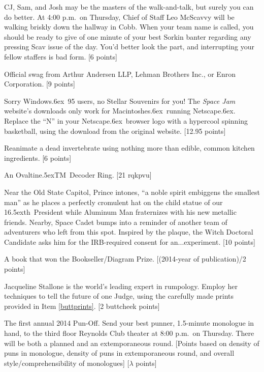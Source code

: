 \documentclass{book}
\def\th{\raise.5ex\hbox{\scriptsize th}}
\def\tm{\raise.5ex\hbox{\scriptsize TM}}
\def\tr{\raise.6ex\hbox{\scriptsize \textregistered}}
\begin{document}
\begin{list}{}{}
\item  CJ, Sam, and Josh may be the masters of the walk-and-talk, but  surely you can do better. At 4:00 p.m.\ on Thursday, Chief of Staff Leo McScavvy  will be walking briskly down the hallway in Cobb. When your team name is called, you should be ready to give of one minute of your best Sorkin banter regarding any pressing Scav issue of the day. You'd better look the part, and interrupting your fellow staffers is bad form. [6 points]

\item Official swag from Arthur Andersen LLP, Lehman Brothers Inc., or Enron Corporation. [9 points]

\item Sorry Windows\tr\ 95 users, no Stellar Souvenirs for you! The \emph{Space Jam} website's downloads only work for Macintoshes\tr\ running Netscape\tr. Replace the ``N'' in your Netscape\tr\ browser logo with a hypercool spinning basketball, using the download from the original website.  [12.95 points]

\setcounter{items}{13}

\item Reanimate a dead invertebrate using nothing more than edible, common kitchen ingredients. [6 points]

\item An Ovaltine\tm\ Decoder Ring. [21 rqkpvu]

\item Near the Old State Capitol, Prince intones, ``a noble spirit embiggens the smallest man'' as he places a perfectly cromulent hat on the child statue of our 16\th\ President while Aluminum Man fraternizes with his new metallic friends. Nearby, Space Cadet bumps into a reminder of another team of adventurers who left from this spot. Inspired by the plaque, the Witch Doctoral Candidate asks him for the IRB-required consent for an...experiment. [10 points] 

\item A book that won the Bookseller/Diagram Prize. [(2014-year of publication)/2 points]

\item Jacqueline Stallone is the world's leading expert in rumpology. Employ her techniques to tell the future of one Judge, using the carefully made prints provided in Item \ref{buttprints}. [2 buttcheek points]

\item \label{punoff}The first annual 2014 Pun-Off. Send your best punner, 1.5-minute monologue in hand, to the third floor Reynolds Club theater at 8:00 p.m.\ on Thursday. There will be both a planned and an extemporaneous round. [Points based on density of puns in monologue, density of puns in extemporaneous round, and overall style/comprehensibility of monologues]  [$\lambda$ points] 


\end{list}
\end{document}
